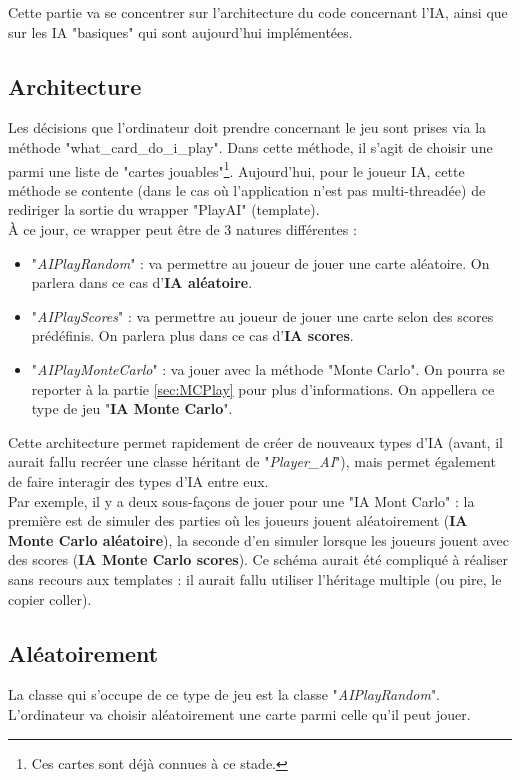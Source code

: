 \documentclass[a4paper,11pt]{article}
\begin{document}
Cette partie va se concentrer sur l'architecture du code concernant l'IA, ainsi que sur les IA "basiques" qui sont aujourd'hui implémentées.
\subsection{Architecture}
Les décisions que l'ordinateur doit prendre concernant le jeu sont prises via la méthode "what\_card\_do\_i\_play". Dans cette méthode, il s'agit de choisir une parmi une liste de "cartes jouables"\footnote{Ces cartes sont déjà connues à ce stade.}. Aujourd'hui, pour le joueur IA, cette méthode se contente (dans le cas o\`u l'application n'est pas multi-threadée) de rediriger la sortie du wrapper "PlayAI" (template). \\

\`A ce jour, ce wrapper peut être de 3 natures différentes : 
\begin{itemize}
\item "\textit{AIPlayRandom}" : va permettre au joueur de jouer une carte aléatoire. On parlera dans ce cas d'\textbf{IA aléatoire}.
\item "\textit{AIPlayScores}" : va permettre au joueur de jouer une carte selon des scores prédéfinis. On parlera plus dans ce cas d'\textbf{IA scores}.
\item "\textit{AIPlayMonteCarlo}" : va jouer avec la méthode "Monte Carlo". On pourra se reporter à la partie \ref{sec:MCPlay} pour plus d'informations. On appellera ce type de jeu "\textbf{IA Monte Carlo}". \\
\end{itemize}

Cette architecture permet rapidement de créer de nouveaux types d'IA (avant, il aurait fallu recréer une classe héritant de "\textit{Player\_AI}"), mais permet également de faire interagir des types d'IA entre eux.\\
Par exemple, il y a deux sous-façons de jouer pour une "IA Mont Carlo" : la première est de simuler des parties o\`u les joueurs jouent aléatoirement (\textbf{IA Monte Carlo aléatoire}), la seconde d'en simuler lorsque les joueurs jouent avec des scores (\textbf{IA Monte Carlo scores}). Ce schéma aurait été compliqué à réaliser sans recours aux templates : il aurait fallu utiliser l'héritage multiple (ou pire, le copier coller).
\subsection{Aléatoirement}
La classe qui s'occupe de ce type de jeu est la classe "\textit{AIPlayRandom}". L'ordinateur va choisir aléatoirement une carte parmi celle qu'il peut jouer. \\
\end{document}
